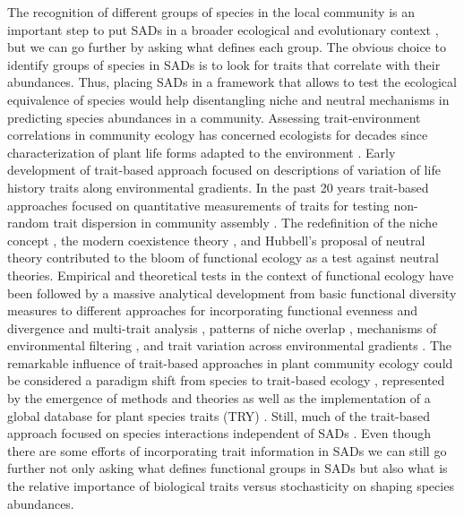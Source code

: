 \documentclass[12pt]{article}
\begin{document}
The recognition of different groups of species in the local community is an important step to put SADs in a broader ecological and evolutionary context \citep{McGill2007, Swenson2012}, but we can go further by asking what defines each group. The obvious choice to identify groups of species in SADs is to look for traits that correlate with their abundances. Thus, placing SADs in a framework that allows to test the ecological equivalence of species would help disentangling niche and neutral mechanisms in predicting species abundances in a community. Assessing trait-environment correlations in community ecology has concerned ecologists for decades since \cite{Raunkiaer1934} characterization of plant life forms adapted to the environment \citep[see also][]{Grime1977, Connell1978}. Early development of trait-based approach focused on descriptions of variation of life history traits along environmental gradients. In the past 20 years trait-based approaches focused on quantitative measurements of traits for testing non-random trait dispersion in community assembly
\citep{Swenson2012}. The redefinition of the niche concept \citep{Chase2003}, the modern coexistence theory \citep{Chesson2000}, and Hubbell's proposal of neutral theory \citep{Hubbell2001} contributed to the bloom of functional ecology as a test against neutral theories. Empirical and theoretical tests in the context of functional ecology have been followed by a massive analytical development \citep{Kraft2010} from basic functional diversity measures
\citep{Petchey2002a, Petchey2007} to different approaches for incorporating functional evenness and divergence \citep{Mason2005, Pavoine2009} and multi-trait analysis \citep{Laliberte2010}, patterns of niche overlap \citep{Mason2008}, mechanisms of environmental filtering \citep{Kraft2007, Mayfield2009}, and trait
variation across environmental gradients \citep{shipley2006plant, cornwell2009community, messier2010traits}. 
The remarkable influence of trait-based approaches in plant community ecology could be considered a paradigm shift from species to trait-based ecology \citep{Pavoine2011, Swenson2012}, represented by the emergence of methods and theories as well as the implementation of a global database for plant species traits (TRY) \citep{Kattage2011}. Still, much of the trait-based approach focused on species interactions independent of SADs \citep{Swenson2012}. 
Even though there are some efforts of incorporating trait information in SADs \citep{Magurran2003, Supp2015} we can still go further not only asking what defines functional groups in SADs but also what is the relative importance of biological traits versus stochasticity on shaping species abundances. 
 
\end{document}
